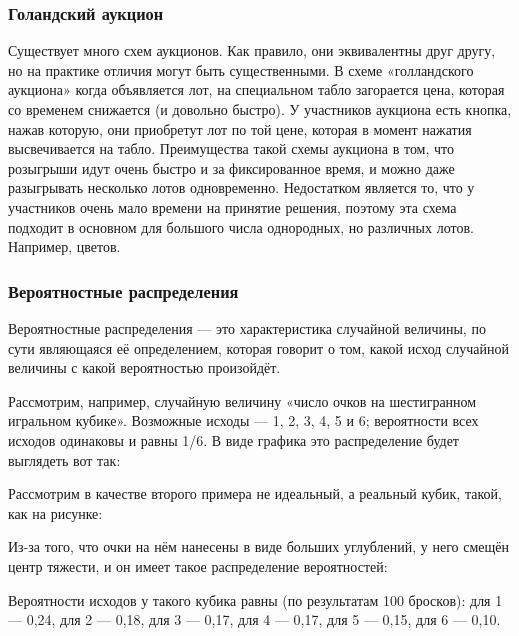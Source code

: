 
\subsubsection*{Голандский аукцион}

Существует много схем аукционов. Как правило, они эквивалентны друг другу, но на практике отличия 
могут быть существенными. В схеме «голландского аукциона» когда объявляется лот, на специальном 
табло загорается цена, которая со временем снижается (и довольно быстро). У участников аукциона 
есть кнопка, нажав которую, они приобретут лот по той цене, которая в момент нажатия высвечивается 
на табло. Преимущества такой схемы аукциона в том, что розыгрыши идут очень быстро и за фиксированное 
время, и можно даже разыгрывать несколько лотов одновременно. Недостатком является то, что у участников 
очень мало времени на принятие решения, поэтому эта схема подходит в основном для большого числа 
однородных, но различных лотов. Например, цветов.


\subsubsection*{Вероятностные распределения}

Вероятностные распределения — это характеристика случайной величины, по сути являющаяся её определением, которая говорит о том, какой исход случайной величины с какой вероятностью произойдёт.

Рассмотрим, например, случайную величину «число очков на шестигранном игральном кубике». Возможные исходы — 1, 2, 3, 4, 5 и 6; вероятности всех исходов одинаковы и равны 1/6. В виде графика это распределение будет выглядеть вот так:


Рассмотрим в качестве второго примера не идеальный, а реальный кубик, такой, как на рисунке:


Из-за того, что очки на нём нанесены в виде больших углублений, у него смещён центр тяжести, и он имеет такое распределение вероятностей:


Вероятности исходов у такого кубика равны (по результатам 100 бросков): \linebreak для 1 — 0,24, для 2 — 0,18, для 3 — 0,17, для 4 — 0,17, для 5 — 0,15, \linebreak для 6 — 0,10.

